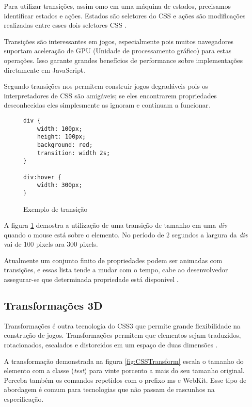 Para utilizar transições, assim omo em uma máquina de estados,
precisamos identificar estados e ações. Estados são seletores do CSS
e ações são modificações realizadas entre esses dois seletores CSS
\autocite{html5mostwanted}.

Transições são interessantes em jogos, especialmente pois muitos
navegadores suportam aceleração de GPU (Unidade de processamento
gráfico) para estas operações. Isso garante grandes benefícios de
performance sobre implementações diretamente em JavaScript.

Segundo \cite{html5mostwanted} transições nos permitem construir jogos
degradáveis pois os interpretadores de CSS são amigáveis; se eles
encontrarem propriedades desconhecidas eles simplesmente as ignoram e
continuam a funcionar.

\begin{figure}
\centering
\begin{verbatim}
div {
    width: 100px;
    height: 100px;
    background: red;
    transition: width 2s;
}

div:hover {
    width: 300px;
}

\end{verbatim}
\caption{Exemplo de transição}
\label{fig:CSSTransition}
\end{figure}

A figura \ref{fig:CSSTransition} demostra a utilização de uma
transição de tamanho em uma \textit{div} quando o mouse está sobre o
elemento. No período de 2 segundos a largura da \textit{div} vai de 100
pixels ara 300 pixels.

Atualmente um conjunto finito de propriedades podem ser animadas
com transições, e essas lista tende a mudar com o tempo, cabe ao
desenvolvedor assegurar-se que determinada propriedade está disponível
\autocite{mdnTransitions}.

\subsection{Transformações 3D}

Transformações é outra tecnologia do CSS3 que permite grande
flexibilidade na construção de jogos. Transformações permitem que
elementos sejam traduzidos, rotacionados, escalados e distorcidos em um
espaço de duas dimensões \autocite{html5mostwanted}.

A transformação demonstrada na figura \ref{fig:CSSTransform} escala o
tamanho do elemento com a classe (\textit{test}) para vinte porcento a
mais do seu tamanho original. Perceba também os comandos repetidos com
o prefixo ms e WebKit. Esse tipo de abordagem é comum para tecnologias
que não passam de rascunhos na especificação.

